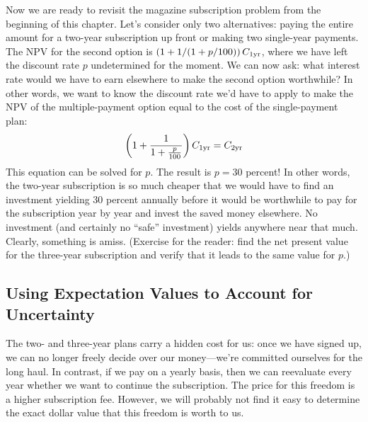 Now we are ready to revisit the magazine subscription problem from the
beginning of this chapter. Let's consider only two alternatives:
paying the entire amount for a two-year subscription up front or
making two single-year payments. The NPV for the second option is
$\left( 1 + 1/(1+p/100) \right) C_{{\rm 1yr}}$, where we have left
the discount rate $p$ undetermined for the moment. We can now ask:
what interest rate would we have to earn elsewhere to make the second
option worthwhile? In other words, we want to know the discount rate
we'd have to apply to make the NPV of the multiple-payment option
equal to the cost of the single-payment plan:
%
\[
\left( 1 + \frac{1}{1+\frac{p}{100}} \right) C_{{\rm 1yr}} = C_{{\rm 2yr}}
\]
%    
This equation can be solved for $p$. The result is $p = 30$ percent!
In other words, the two-year subscription is so much cheaper that we
would have to find an investment yielding 30 percent annually before
it would be worthwhile to pay for the subscription year by year and
invest the saved money elsewhere. No investment (and certainly no
``safe'' investment) yields anywhere near that much. Clearly,
something is amiss. (Exercise for the reader: find the net present
value for the three-year subscription and verify that it leads to the
same value for $p$.)

\vspace*{-6pt}
\subsection{Using Expectation Values to Account for Uncertainty}

 
The two- and three-year plans carry a hidden cost for us: once we have
signed up, we can no longer freely\vadjust{\pagebreak} decide over our money---we're
committed ourselves for the long haul. In contrast, if we pay on a
yearly basis, then we can reevaluate every year whether we want to
continue the subscription.  The price for this freedom is a higher
subscription fee. However, we will probably not find it easy to
determine the exact dollar value that this freedom is worth to us.
    

